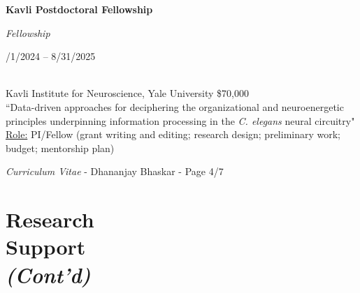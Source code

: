 \documentclass[margin,line]{res}
\begin{document}
\begin{resume}
\noindent
\begin{minipage}[t]{0.4\textwidth}
    \raggedright \textbf{Kavli Postdoctoral Fellowship}
\end{minipage}%
\begin{minipage}[t]{0.3\textwidth}
    \centering \textit{Fellowship}
\end{minipage}%
\begin{minipage}[t]{0.3\textwidth}
    /1/2024 -- 8/31/2025
\end{minipage}
\\[.2em]
Kavli Institute for Neuroscience, Yale University \hfill \$70,000\\[.2em]
``Data-driven approaches for deciphering the organizational and neuroenergetic principles underpinning information processing in the \textit{C. elegans} neural circuitry"\\[.2em]
\ul{Role:} PI/Fellow {\small (grant writing and editing; research design; preliminary work; budget; mentorship plan)}


\newpage
\begin{flushright}
\textit{Curriculum Vitae} - Dhananjay Bhaskar - Page 4/7
\end{flushright}
\vspace*{.02cm}

\section{\sc Research\\ Support\\\textit{(Cont'd)}}


\end{resume}
\end{document}
